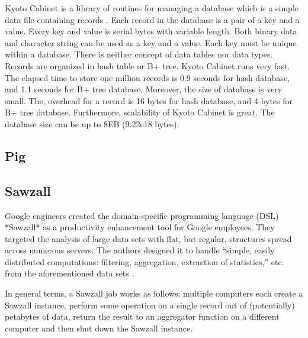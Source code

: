      Kyoto Cabinet is a library of routines for managing a database
     which is a simple data file containing records \cite{www-KyotoCabinet}.
     Each record in the database is a
     pair of a key and a value. Every key and value is serial bytes
     with variable length. Both binary data and character string can
     be used as a key and a value. Each key must be unique within a
     database.  There is neither concept of data tables nor data
     types. Records are organized in hash table or B+ tree. Kyoto
     Cabinet runs very fast. The elapsed time to store one million
     records is 0.9 seconds for hash database, and 1.1 seconds for B+
     tree database. Moreover, the size of database is very small. The,
     overhead for a record is 16 bytes for hash database, and 4 bytes
     for B+ tree database. Furthermore, scalability of Kyoto Cabinet
     is great. The database size can be up to 8EB (9.22e18 bytes).


     \pv

\subsection{Pig}

\pv 

\subsection{Sawzall}

     Google engineers created the domain-specific programming language
     (DSL) *Sawzall* as a productivity enhancement tool for Google
     employees.  They targeted the analysis of large data sets with
     flat, but regular, structures spread across numerous servers.
     The authors designed it to handle ``simple, easily distributed
     computations: filtering, aggregation, extraction of statistics,''
     etc. from the aforementioned data sets
     \cite{pike05sawzall}.

     In general terms, a Sawzall job works as follows: multiple
     computers each create a Sawzall instance, perform some operation
     on a single record out of (potentially) petabytes of data, return
     the result to an aggregator function on a different computer and
     then shut down the Sawzall instance.

